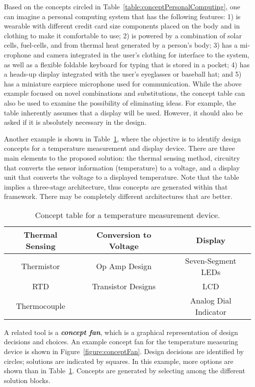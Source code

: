 Based on the concepts circled in 
Table~\ref{table:conceptPersonalComputing}, one can imagine a personal
computing system that has the following features: 1) is wearable with
different credit card size components placed on the body and in clothing
to make it comfortable to use; 2) is powered by a combina­tion of solar
cells, fuel-cells, and from thermal heat generated by a person's body;
3) has a mi­crophone and camera integrated in the user's clothing for
interface to the system, as well as a flexible foldable keyboard for
typing that is stored in a pocket; 4) has a heads-up display inte­grated
with the user's eyeglasses or baseball hat; and 5) has a miniature
earpiece microphone used for communication. While the above example
focused on novel combinations and substitu­tions, the concept table can
also be used to examine the possibility of eliminating ideas. For
example, the table inherently assumes that a display will be used.
However, it should also be asked if it is abso­lutely necessary in the
design.

Another example is shown in Table~\ref{table:conceptTemperature}, 
where the objective is to
identify design concepts for a temperature measurement and display
device. There are three main elements to the pro­posed solution: the
thermal sensing method, circuitry that converts the sensor in­formation
(temperature) to a voltage, and a display unit that converts the voltage
to a dis­played temperature. Note that the table implies a three-stage
architecture, thus concepts are generated within that framework. There
may be completely different architec­tures that are better.


\begin{table}
\caption{Concept table for a temperature measurement device.}
\label{table:conceptTemperature}
\begin{tabular}{|c|c|c|}
\hline
\rowcolor{Gray}
\textbf{Thermal Sensing} &
\textbf{Conversion to Voltage} &
\textbf{Display} \\ \hline
Thermistor & Op Amp Design & Seven-Segment LEDs \\ \hline
RTD & Transistor Designs & LCD \\ \hline
Thermocouple & & Analog Dial Indicator \\ \hline
\end{tabular}
\end{table}

A related tool is a \emph{\textbf{concept fan}}, which is a graphical
representation of design decisions and choices. An example concept fan
for the temperature measuring device is shown in 
Figure~\ref{figure:conceptFan}. Design
decisions are identified by circles; solutions are indicated by squares.
In this example, more options are shown than in 
Table~\ref{table:conceptTemperature}. Concepts are
generated by selecting among the different solution blocks.

